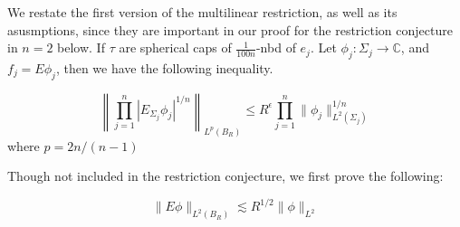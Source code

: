 We restate the first version of the multilinear restriction, as well as its asusmptions, since they are important in our proof for the restriction conjecture in $n=2$ below. If $\tau$ are spherical caps of $\frac{1}{100n}$-nbd of $e_j$. Let $\phi_j: \Sigma_j\to\mathbb{C}$, and $f_j=E\phi_j$, then we have the following inequality.
\begin{theorem}
\begin{equation*}
    \left\|\prod_{j=1}^n|E_{\Sigma_j}\phi_j|^{1/n} \right\|_{L^p(B_R)}\leq R^\epsilon\prod_{j=1}^n\|\phi_j\|_{L^2(\Sigma_j)}^{1/n}
\end{equation*}
where $p=2n/(n-1)$
\end{theorem}
Though not included in the restriction conjecture, we first prove the following:
\begin{proposition}
    \begin{equation*}
        \|E\phi\|_{L^2(B_R)}\lesssim R^{1/2}\|\phi\|_{L^2}
    \end{equation*}
\end{proposition}
